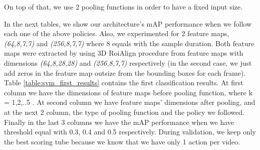 On top of that, we use 2 pooling functions in order to have a fixed input size. \par
In the next tables, we show our architecture's  mAP performance when we follow each one of the above policies. Also,
we experimented for 2 feature maps, \textit{(64,8,7,7)} and \textit{(256,8,7,7)} where 8 equals with the sample duration.
Both feature maps were extracted by using 3D RoiAlign procedure from feature maps with dimensions \textit{(64,8,28,28)} and
\textit{(256,8,7,7)} respectively (in the second case, we just add zeros in the feature map outsize from the bounding boxes for
each frame). Table \ref{table:svm_first_results} contains the first classification results. At first column we have the dimensions
of feature maps before pooling function, where k = 1,2,..5 . At second column we have feature maps' dimensions after pooling, and at
the next 2 column, the type of pooling function and the policy we followed. Finally in the last 3 columns we have the mAP performance
when we have threshold equal with 0.3, 0.4 and 0.5 respectively. During validation, we keep only the best scoring tube because we know that
we have only 1 action per video.

